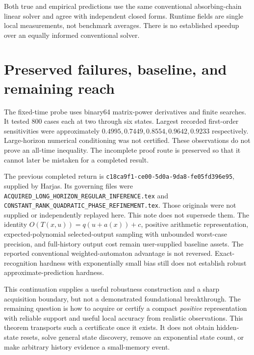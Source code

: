 \documentclass[11pt]{article}
\begin{document}
Both true and empirical predictions use the same conventional
absorbing-chain linear solver and agree with independent closed forms.
Runtime fields are single local measurements, not benchmark averages.
There is no established speedup over an equally informed conventional
solver.

\section{Preserved failures, baseline, and remaining reach}

The fixed-time probe uses binary64 matrix-power derivatives and finite
searches. It tested 800 cases each at two through six states. Largest
recorded first-order sensitivities were approximately
$0.4995,0.7449,0.8554,0.9642,0.9233$ respectively.
Large-horizon numerical conditioning was not certified. These observations
do not prove an all-time inequality. The incomplete proof route is
preserved so that it cannot later be mistaken for a completed result.

The previous completed return is
\texttt{c18ca9f1-ce00-5d0a-9da8-fe05fd396e95}, supplied by Harjas.
Its governing files were
\texttt{ACQUIRED\_LONG\_HORIZON\_REGULAR\_INFERENCE.tex} and
\texttt{CONSTANT\_RANK\_QUADRATIC\_PHASE\_REFINEMENT.tex}.
Those originals were not supplied or independently replayed here.
This note does not supersede them. The identity
$O(T(x,u))=q(u+a(x))+c$, positive arithmetic representation,
expected-polynomial selected-output sampling with unbounded worst-case
precision, and full-history output cost remain user-supplied baseline
assets. The reported conventional weighted-automaton advantage is not
reversed. Exact-recognition hardness with exponentially small bias still
does not establish robust approximate-prediction hardness.

This continuation supplies a useful robustness construction and a sharp
acquisition boundary, but not a demonstrated foundational breakthrough.
The remaining question is how to acquire or certify a compact
\emph{positive} representation with reliable support and useful local
accuracy from realistic observations. This theorem transports such a
certificate once it exists. It does not obtain hidden-state resets,
solve general state discovery, remove an exponential state count, or
make arbitrary history evidence a small-memory event.
\end{document}
